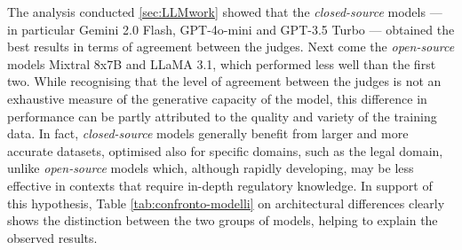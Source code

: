 The analysis conducted \ref{sec:LLMwork} showed that the \textit{closed-source} models — in particular Gemini 2.0 Flash, GPT-4o-mini and GPT-3.5 Turbo — obtained the best results in terms of agreement between the judges. Next come the \textit{open-source}  models Mixtral 8x7B and LLaMA 3.1, which performed less well than the first two.
While recognising that the level of agreement between the judges is not an exhaustive measure of the generative capacity of the model, this difference in performance can be partly attributed to the quality and variety of the training data.
In fact, \textit{closed-source} models generally benefit from larger and more accurate datasets, optimised also for specific domains, such as the legal domain, unlike \textit{open-source} models which, although rapidly developing, may be less effective in contexts that require in-depth regulatory knowledge.
In support of this hypothesis, Table \ref{tab:confronto-modelli} on architectural differences clearly shows the distinction between the two groups of models, helping to explain the observed results.